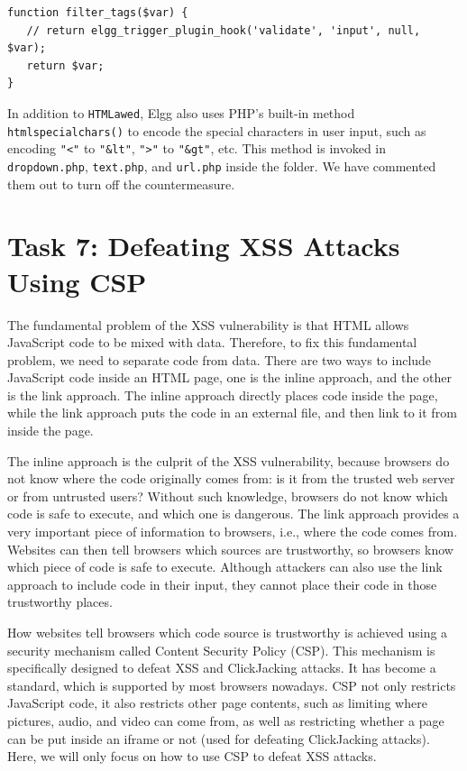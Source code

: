 \begin{lstlisting}
function filter_tags($var) {
   // return elgg_trigger_plugin_hook('validate', 'input', null, $var);
   return $var;
}
\end{lstlisting}
 

In addition to {\tt HTMLawed}, Elgg also uses PHP's built-in
method \texttt{htmlspecialchars()} to
encode the special characters in
user input, such as encoding {\tt "<"} to {\tt "\&lt"}, {\tt ">"} to {\tt "\&gt"}, etc.
This method is invoked in \texttt{dropdown.php}, \texttt{text.php}, 
and \texttt{url.php} inside 
the  folder. 
We have commented them out to turn off the countermeasure. 


\section{Task 7: Defeating XSS Attacks Using CSP}

The fundamental problem of the XSS vulnerability is that HTML allows JavaScript code to be
mixed with data. Therefore, to fix this fundamental problem, we need to separate code from
data. There are two ways to include JavaScript code inside an HTML page, one is
the inline approach, and the other is the link approach.
The inline approach directly places code inside the page, while the
link approach puts the code in an external file, and then link to it
from inside the page.

The inline approach is the culprit of the XSS vulnerability, because
browsers do not know where the code originally comes from: is it from the trusted
web server or from untrusted users? Without such knowledge, browsers
do not know which code is safe to execute, and
which one is dangerous.
The link approach provides a very important piece of information to
browsers, i.e., where
the code comes from. Websites can then tell browsers which sources are
trustworthy, so browsers know which piece of code is safe to execute.
Although attackers can also use the link approach to
include code in their input, they cannot place their code in
those trustworthy places.

How websites tell browsers which code source is trustworthy is achieved
using a security mechanism called Content Security Policy (CSP). This
mechanism is specifically designed to defeat XSS and ClickJacking attacks.
It has become a standard, which is supported by most browsers nowadays.
CSP not only restricts JavaScript code, it also restricts other page contents, such as
limiting where pictures, audio, and video can come from, as well as restricting
whether a page can be put inside an iframe or not (used for defeating ClickJacking
attacks). Here, we will only focus on how to use CSP to defeat XSS attacks.



